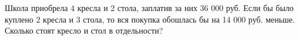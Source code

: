 \begin{ex}
	\begin{condition}
		Школа приобрела \( 4 \) кресла и 2 стола, заплатив за них 36 000 руб. Если бы было куплено 2 кресла и 3 стола, то вся покупка обошлась бы на 14 000 руб. меньше. Сколько стоят кресло и стол в отдельности?
	\end{condition}
\end{ex}